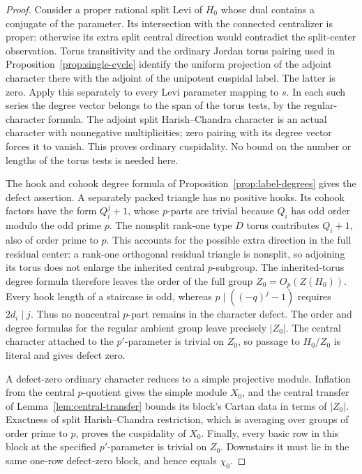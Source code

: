 \begin{proof}
Consider a proper rational split Levi of $H_0$ whose dual contains a
conjugate of the parameter.  Its intersection with the connected
centralizer is proper: otherwise its extra split central direction
would contradict the split-center observation.  Torus transitivity
and the ordinary Jordan torus pairing used in
Proposition~\ref{prop:single-cycle} identify the uniform projection
of the adjoint character there with the adjoint of the unipotent
cuspidal label.  The latter is zero.  Apply this separately to every
Levi parameter mapping to $s$.  In each such series the degree
vector belongs to the span of the torus tests, by the regular-character
formula.  The adjoint split Harish--Chandra character is an actual
character with nonnegative multiplicities; zero pairing with its
degree vector forces it to vanish.  This proves ordinary cuspidality.
No bound on the number or lengths of the torus tests is needed here.

The hook and cohook degree formula of
Proposition~\ref{prop:label-degrees} gives the defect assertion.
A separately packed triangle has no positive hooks.  Its cohook
factors have the form $Q_i^j+1$, whose $p$-parts are trivial because
$Q_i$ has odd order modulo the odd prime $p$.  The nonsplit rank-one
type $D$ torus contributes $Q_i+1$, also of order prime to $p$.
This accounts for the possible extra direction in the full residual
center: a rank-one orthogonal residual triangle is nonsplit, so
adjoining its torus does not enlarge the inherited central
$p$-subgroup.  The inherited-torus degree formula therefore leaves
the order of the full group $Z_0=O_p(Z(H_0))$.
Every hook length of a staircase is odd, whereas
$p\mid((-q)^j-1)$ requires $2d_i\mid j$.  Thus no noncentral
$p$-part remains in the character defect.  The order and degree
formulas for the regular ambient group leave precisely $|Z_0|$.
The central character attached to the $p'$-parameter is trivial on
$Z_0$, so passage to $H_0/Z_0$ is literal and gives defect zero.

A defect-zero ordinary character reduces to a simple projective
module.  Inflation from the central $p$-quotient gives the simple
module $X_0$, and the central transfer of
Lemma~\ref{lem:central-transfer} bounds its block's Cartan data in
terms of $|Z_0|$.  Exactness of split Harish--Chandra restriction,
which is averaging over groups of order prime to $p$, proves the
cuspidality of $X_0$.  Finally, every basic row in this block at the
specified $p'$-parameter is trivial on $Z_0$.  Downstairs it must lie
in the same one-row defect-zero block, and hence equals $\chi_0$.
\end{proof}

